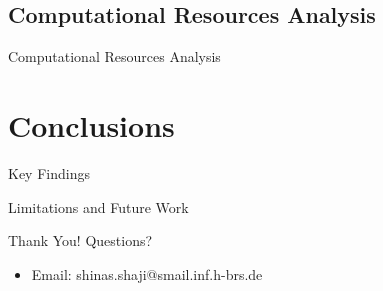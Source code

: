 \documentclass[aspectratio=169]{beamer}
\begin{document}
\subsection{Computational Resources Analysis}
\begin{frame}{Computational Resources Analysis}
\end{frame}

\section{Conclusions}
\begin{frame}{Key Findings}
\end{frame}

\begin{frame}{Limitations and Future Work}
\end{frame}

\begin{frame}{Thank You!}
    \centering
    \vfill
    {\LARGE Questions?}
    \vfill
    \begin{itemize}
        \item Email: shinas.shaji@smail.inf.h-brs.de
    \end{itemize}
    \vfill
\end{frame}
\end{document}
